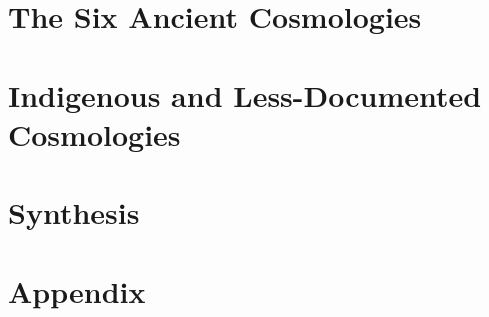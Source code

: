 \documentclass[11pt,oneside]{book}
\begin{document}
\part{The Six Ancient Cosmologies}










\part{Indigenous and Less-Documented Cosmologies}






















\part{Synthesis}





\appendix
\part{Appendix}






\backmatter

\end{document}
